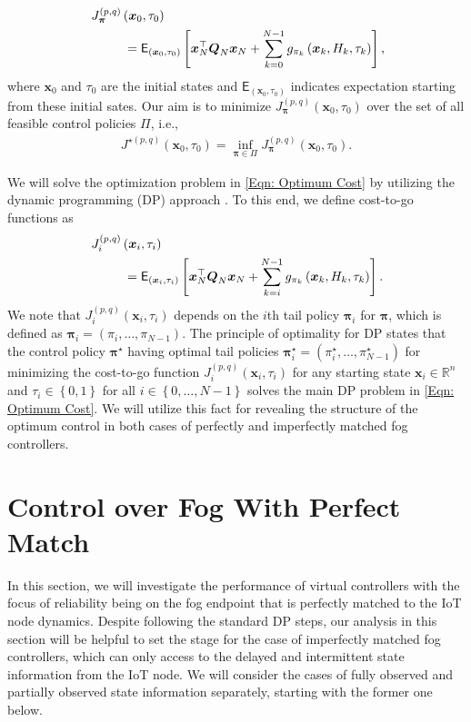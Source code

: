 \documentclass[10pt, journal, letterpaper]{IEEEtran}
\newcommand{\paren}[1]{\left(#1\right)}
\newcommand{\brparen}[1]{\left\{#1\right\}}
\newcommand{\field}[1]{\ensuremath{\mathbb{#1}}}
\newcommand{\R}{\ensuremath{\field{R}}} %
\newcommand{\1}{\ensuremath{\mathbf{1}}} %
\newcommand{\EW}{\ensuremath{\mathsf{E}}} %
\newcommand{\ESI}[2]{\ensuremath{\mathsf{E}_{#2}\left[#1 \right]}}
\newcommand{\cost}[2]{\ensuremath{J_{\vec{\pi}}^{\paren{#1, #2}}\paren{\vec{x}_0, \tau_0}}}
\newcommand{\mincost}[2]{\ensuremath{J^{\star\paren{#1, #2}}}\paren{\vec{x}_0, \tau_0}}
\newcommand{\gocost}[3]{\ensuremath{J_{#3}^{\paren{#1, #2}}\paren{\vec{x}_{#3}, \tau_{#3}}}}
\renewcommand{\vec}[1]{\ensuremath{\boldsymbol{#1}}} %
\begin{document}
\begin{eqnarray}
\lefteqn{\cost{p}{q}} \hspace{8.0cm} \nonumber \\
\lefteqn{=\ESI{\vec{x}_N^\top \vec{Q}_N \vec{x}_N + \sum_{k=0}^{N-1} g_{\pi_k}\paren{\vec{x}_k, H_k, \tau_k}}{\paren{\vec{x}_0, \tau_0}},} \hspace{7.0cm} \label{Eqn: Total Cost}
\end{eqnarray}
where $\vec{x}_0$ and $\tau_0$ are the initial states and $\EW_{\paren{\vec{x}_0, \tau_0}}$ indicates expectation starting from these initial sates. Our aim is to minimize $\cost{p}{q}$ over the set of all feasible control policies $\Pi$, i.e.,
\begin{eqnarray}
\mincost{p}{q} = \inf_{\vec{\pi} \in \Pi} \cost{p}{q}. \label{Eqn: Optimum Cost}
\end{eqnarray}

We will solve the optimization problem in \eqref{Eqn: Optimum Cost} by utilizing the dynamic programming (DP) approach \cite{Bertsekas95}. To this end, we define cost-to-go functions as
\begin{eqnarray}
\lefteqn{\gocost{p}{q}{i}} \hspace{8.0cm} \nonumber \\
\lefteqn{= \ESI{\vec{x}_N^\top \vec{Q}_N \vec{x}_N + \sum_{k=i}^{N-1} g_{\pi_k}\paren{\vec{x}_k, H_k, \tau_k}}{\paren{\vec{x}_i, \tau_i}}.} \hspace{7.0cm} \label{Eqn: Cost-to-Go}
\end{eqnarray}
We note that $\gocost{p}{q}{i}$ depends on the $i$th tail policy $\vec{\pi}_i$  for $\vec{\pi}$, which is defined as $\vec{\pi}_i = \paren{\pi_i, \ldots, \pi_{N-1}}$.  The principle of optimality for DP states that the control policy $\vec{\pi}^\star$ having optimal tail policies $\vec{\pi}^{\star}_i = \paren{\pi_i^\star, \ldots, \pi_{N-1}^\star}$ for minimizing the cost-to-go function $\gocost{p}{q}{i}$ for any starting state $\vec{x}_i \in \R^n$ and $\tau_i \in \brparen{0, 1}$ for all $i \in \brparen{0, \ldots, N-1}$ solves the main DP problem in \eqref{Eqn: Optimum Cost}. We will utilize this fact for revealing the structure of the optimum control in both cases of perfectly and imperfectly matched fog controllers.


\section{Control over Fog With Perfect Match} \label{Section: Control Without Latency}
In this section, we will investigate the performance of virtual controllers with the focus of reliability being on the fog endpoint that is perfectly matched to the IoT node dynamics. Despite following the standard DP steps, our analysis in this section will be helpful to set the stage for the case of imperfectly matched fog controllers, which can only access to the delayed and intermittent state information from the IoT node.  We will consider the cases of fully observed and partially observed state information separately, starting with the former one below.
\end{document}

